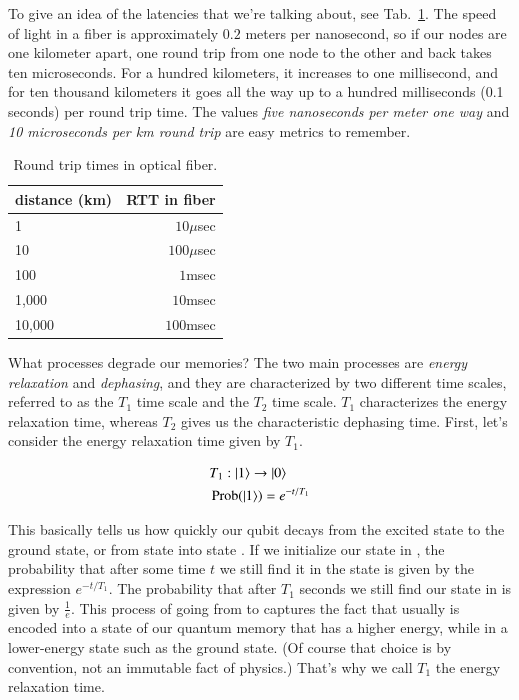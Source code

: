 To give an idea of the latencies that we're talking about, see Tab.~\ref{tab:rtt}. The speed of light in a fiber is approximately $0.2$ meters per nanosecond,
so if our nodes are one kilometer apart, one round trip from one node to the other and back takes ten microseconds. For a hundred kilometers, it increases to one millisecond, and for ten thousand kilometers it goes all the way up to a hundred milliseconds (0.1 seconds) per round trip time.  The values \emph{five nanoseconds per meter one way} and \emph{10 microseconds per km round trip} are easy metrics to remember.

\begin{table}
\centering
\begin{tabular}{l|r}
distance (km)  & RTT in fiber \\\hline
1     & $10\mu$sec \\
10    & $100\mu$sec \\
100   & $1$msec \\
1,000 & $10$msec \\
10,000 & $100$msec
\end{tabular}
\caption{Round trip times in optical fiber.}
\label{tab:rtt}
\end{table}

What processes degrade our memories? The two main processes are \emph{energy relaxation} and \emph{dephasing}, and they are characterized by two different time scales, referred to as the $T_1$ time scale and the $T_2$ time scale.  $T_1$ characterizes the energy relaxation time, whereas $T_2$ gives us the characteristic dephasing time. First, let's consider the energy relaxation time given by $T_1$.

\begin{equation}
\begin{aligned}
&T_1:|1\rangle \rightarrow|0\rangle \\
&\operatorname{Prob}(\left| 1 \right\rangle)=e^{-t / T_1}
\end{aligned}
\end{equation}

This basically tells us how quickly our qubit decays from the excited state to the ground state, or from state  into state . If we initialize our state in , the probability that after some time $t$ we still find it in the state  is given by the expression $e^{-t/T_1}$. The probability that after $T_1$ seconds we still find our state in  is given by $\frac{1}{e}$. This process of going from  to  captures the fact that usually  is encoded into a state of our quantum memory that has a higher energy, while  in a lower-energy state such as the ground state. (Of course that choice is by convention, not an immutable fact of physics.)  That's why we call $T_1$ the energy relaxation time.


